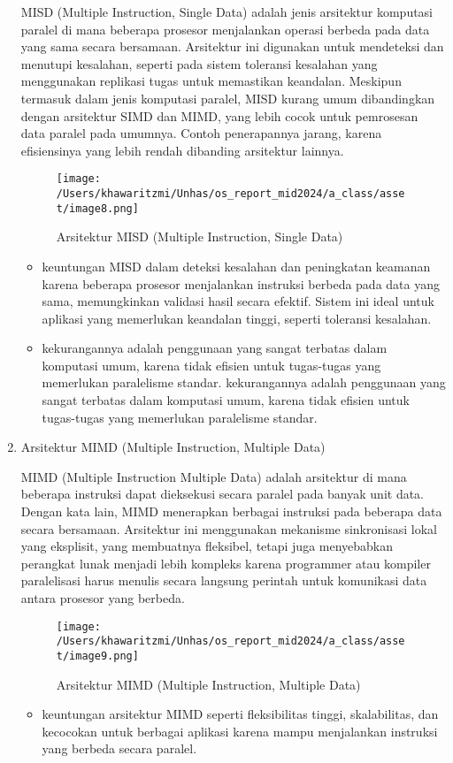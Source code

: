 \documentclass[12pt]{article}
\begin{document}
\begin{enumerate}
    MISD (Multiple Instruction, Single Data) adalah jenis arsitektur komputasi paralel di mana beberapa prosesor menjalankan operasi berbeda pada data yang sama secara bersamaan. Arsitektur ini digunakan untuk mendeteksi dan menutupi kesalahan, seperti pada sistem toleransi kesalahan yang menggunakan replikasi tugas untuk memastikan keandalan. Meskipun termasuk dalam jenis komputasi paralel, MISD kurang umum dibandingkan dengan arsitektur SIMD dan MIMD, yang lebih cocok untuk pemrosesan data paralel pada umumnya. Contoh penerapannya jarang, karena efisiensinya yang lebih rendah dibanding arsitektur lainnya.
    \begin{figure}[h]
        \centering
        \texttt{[image: /Users/khawaritzmi/Unhas/os\_report\_mid2024/a\_class/asset/image8.png]}  %
        \caption{Arsitektur MISD (Multiple Instruction, Single Data)}
        \label{fig:contoh_gambar}
    \end{figure}
    \begin{itemize}
        \item keuntungan MISD dalam deteksi kesalahan dan peningkatan keamanan karena beberapa prosesor menjalankan instruksi berbeda pada data yang sama, memungkinkan validasi hasil secara efektif. Sistem ini ideal untuk aplikasi yang memerlukan keandalan tinggi, seperti toleransi kesalahan.
        \item kekurangannya adalah penggunaan yang sangat terbatas dalam komputasi umum, karena tidak efisien untuk tugas-tugas yang memerlukan paralelisme standar. kekurangannya adalah penggunaan yang sangat terbatas dalam komputasi umum, karena tidak efisien untuk tugas-tugas yang memerlukan paralelisme standar. 
    \end{itemize}
    \item Arsitektur MIMD (Multiple Instruction, Multiple Data)
    
    MIMD (Multiple Instruction Multiple Data) adalah arsitektur di mana beberapa instruksi dapat dieksekusi secara paralel pada banyak unit data. Dengan kata lain, MIMD menerapkan berbagai instruksi pada beberapa data secara bersamaan. Arsitektur ini menggunakan mekanisme sinkronisasi lokal yang eksplisit, yang membuatnya fleksibel, tetapi juga menyebabkan perangkat lunak menjadi lebih kompleks karena programmer atau kompiler paralelisasi harus menulis secara langsung perintah untuk komunikasi data antara prosesor yang berbeda.
    \begin{figure}[h]
        \centering
        \texttt{[image: /Users/khawaritzmi/Unhas/os\_report\_mid2024/a\_class/asset/image9.png]}  %
        \caption{Arsitektur MIMD (Multiple Instruction, Multiple Data)}
        \label{fig:contoh_gambar}
    \end{figure}
    \begin{itemize}
        \item keuntungan arsitektur MIMD seperti fleksibilitas tinggi, skalabilitas, dan kecocokan untuk berbagai aplikasi karena mampu menjalankan instruksi yang berbeda secara paralel.


\end{itemize}
\end{enumerate}
\end{document}

